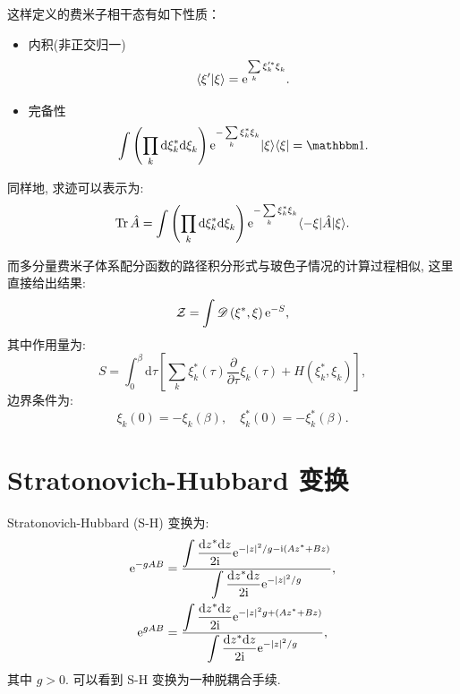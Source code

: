 这样定义的费米子相干态有如下性质：
\begin{itemize} 
\item 内积(非正交归一)
\begin{equation}
\langle\xi^{\prime} | \xi \rangle=\mathrm{e}^{\sum\limits_{k} \xi_{k}^{\prime *} \xi^{}_k} .
\end{equation}
\item 完备性
\begin{equation}
\int\left(\prod_{k} \mathrm{d} \xi_{k}^{*} \mathrm{d} \xi^{}_{k}\right) \e^{-\sum\limits_{k} \xi^*_{k} \xi^{}_{k}}|\xi\rangle\langle\xi|=\mathbbm 1 .
\end{equation}
\end{itemize}

同样地, 求迹可以表示为:
\begin{equation}
\operatorname{Tr} \hat{A}=\int\left(\prod_{k} \mathrm{d} \xi_{k}^{*} \mathrm{d} \xi^{}_{k}\right) \mathrm{e}^{-\sum\limits_{k} \xi^*_{k} \xi^{}_{k}}\langle-\xi|\hat{A}| \xi\rangle .
\end{equation}

而多分量费米子体系配分函数的路径积分形式与玻色子情况的计算过程相似, 这里直接给出结果:
\begin{equation}
\mathcal{Z}=\int \mathscr{D}\left(\xi^{*}, \xi\right) \mathrm{e}^{-S},
\end{equation}
其中作用量为:
\begin{equation}
S=\int_{0}^{\beta} \mathrm{d} \tau\left[\sum_{k}\xi_{k}^{*}(\tau) \frac{\partial}{\partial \tau} \xi_{k}(\tau)+H\left(\xi_{k}^{*} , \xi^{}_{k}\right)\right] ,
\end{equation}
边界条件为:
\begin{equation}
\xi^{}_{k}(0) =-\xi^{}_{k} ( \beta ),\quad \xi_{k}^{*}(0)=-\xi_{k}^{*}(\beta).
\end{equation}

\section{Stratonovich-Hubbard 变换}
Stratonovich-Hubbard (S-H) 变换为:
\begin{align}
\mathrm{e}^{-g A B}&=\frac{\displaystyle\int \frac{\mathrm{d} z^{*} \mathrm{d} z}{2 \mathrm{i}} \mathrm{e}^{-|z|^{2} / g- \mathrm{i}\left(A z^{*}+B z\right)} }{ \displaystyle\int \frac{\mathrm{d} z^{*} \mathrm{d} z}{2  \mathrm{i}} \mathrm{e}^{-|z|^{2} / g}},\nonumber\\
\mathrm{e}^{g A B}&=\frac{\displaystyle\int \frac{\mathrm{d} z^{*} \mathrm{d} z}{2  \mathrm{i}} \mathrm{e}^{-|z|^{2}g+\left(A z^{*}+B z\right)}}{\displaystyle\int \frac{\mathrm{d} z^{*} \mathrm{d} z}{2  \mathrm{i}} \mathrm{e}^{-|z|^{2} / g}},
\end{align}
其中 $g>0$. 可以看到 S-H 变换为一种脱耦合手续.

